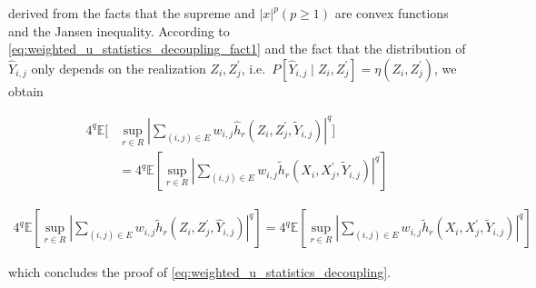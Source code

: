 \documentclass[letterpaper]{article} %
\def\DoubleColumn{}
\def\DoubleColumnEnd{}
\def\SingleColumn{}
\def\SingleColumnEnd{}
\newcommand{\E}{\mathbb{E}}
\newcommand{\Pro}{P}
\newcommand{\pair}[1]{(#1)}
\begin{document}
    \SingleColumnEnd
    derived from the facts that the supreme and $|x|^p (p\ge1)$ are convex functions and the Jansen inequality. According to \eqref{eq:weighted_u_statistics_decoupling_fact1} and the fact that the distribution of $\hat{Y}_{i,j}$ only depends on the realization $Z_i,Z_j^\prime$, i.e.\ $\Pro[\hat{Y}_{i,j}\mid Z_i,Z_j^\prime]=\eta(Z_i,Z_j^\prime)$, we obtain
    \DoubleColumn
    \begin{align*}
        4^q\E[&\sup_{r\in R}|\sum_{\pair{i,j}\in E}w_{i,j}\hat{h}_r(Z_i,Z_j^\prime,\tilde{Y}_{i,j})|^q]\\
        &= 4^q\E[\sup_{r\in R}|\sum_{\pair{i,j}\in E}w_{i,j}\tilde{h}_r(X_i,X_j^\prime,\tilde{Y}_{i,j})|^q]
    \end{align*}
    \DoubleColumnEnd
    \SingleColumn
    \begin{align*}
        4^q\E[\sup_{r\in R}|\sum_{\pair{i,j}\in E}w_{i,j}\tilde{h}_r(Z_i,Z_j^\prime,\hat{Y}_{i,j})|^q]= 4^q\E[\sup_{r\in R}|\sum_{\pair{i,j}\in E}w_{i,j}\tilde{h}_r(X_i,X_j^\prime,\tilde{Y}_{i,j})|^q]
    \end{align*}
    \SingleColumnEnd
    which concludes the proof of \eqref{eq:weighted_u_statistics_decoupling}.
\end{document}

